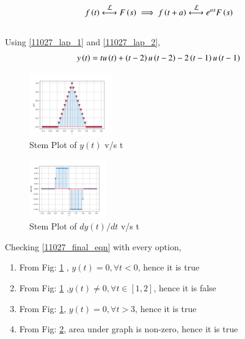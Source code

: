 \documentclass[journal,12pt,twocolumn]{IEEEtran}
\theoremstyle{remark}
\begin{document}
\begin{align}
    f\brak{t} \system{L} F\brak{s}  \implies f\brak{t+a} \system{L} e^{as}F\brak{s} \label{11027_lap_2}
\end{align}\\
Using \eqref{11027_lap_1} and \eqref{11027_lap_2}, 
\begin{align}
    y\left(t\right) = tu\left(t\right) + \left(t-2\right)u\left(t-2\right) -2\left(t-1\right)u\left(t-1\right) \label{11027_final_eqn}
\end{align}
\begin{figure}[h]
    \includegraphics[width=0.3218\textwidth]{figs/y(t)_vs_t.png}
    \caption{Stem Plot of $y(t)$ v/s t}\label{11027_y(t)_plot}
\end{figure}
\begin{figure}[h]
    \includegraphics[width=0.3\textwidth]{figs/dy_dt_vs_t.png}
    \caption{Stem Plot of $dy(t)/dt$ v/s t}\label{11027_dy_dt_plot}
\end{figure}
Checking \eqref{11027_final_eqn} with every option,\\
\begin{enumerate}[label = (\Alph*)]
	\item From Fig: \ref{11027_y(t)_plot} , $y(t) = 0, \forall t<0$, hence it is true\\
	\item From Fig: \ref{11027_y(t)_plot} ,$y(t) \neq 0,\forall t \in [1,2]$, hence it is false\\
	\item From Fig: \ref{11027_y(t)_plot}, $y(t) =0, \forall t>3$, hence it is true\\
	\item From Fig: \ref{11027_dy_dt_plot}, area under graph is non-zero, hence it is true\\
\end{enumerate}
\end{document}
